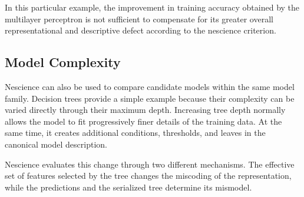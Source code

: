 In this particular example, the improvement in training accuracy obtained by the multilayer perceptron is not sufficient to compensate for its greater overall representational and descriptive defect according to the nescience criterion.


\subsection*{Model Complexity}

Nescience can also be used to compare candidate models within the same model family. Decision trees provide a simple example because their complexity can be varied directly through their maximum depth. Increasing tree depth normally allows the model to fit progressively finer details of the training data. At the same time, it creates additional conditions, thresholds, and leaves in the canonical model description.

Nescience evaluates this change through two different mechanisms. The effective set of features selected by the tree changes the miscoding of the representation, while the predictions and the serialized tree determine its mismodel.

